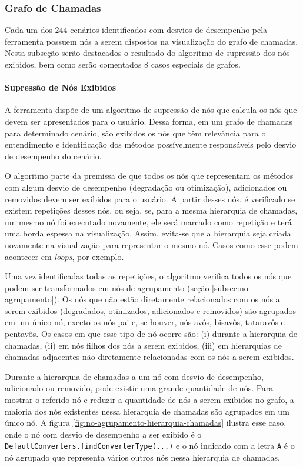 \subsubsection{Grafo de Chamadas} \label{subsec:avaliacao-comportamento-grafo-chamadas}

Cada um dos 244 cenários identificados com desvios de desempenho pela ferramenta possuem nós a serem dispostos na visualização do grafo de chamadas. Nesta subseção serão destacados o resultado do algoritmo de supressão dos nós exibidos, bem como serão comentados 8 casos especiais de grafos.

\paragraph{Supressão de Nós Exibidos}

A ferramenta dispõe de um algoritmo de supressão de nós que calcula os nós que devem ser apresentados para o usuário. Dessa forma, em um grafo de chamadas para determinado cenário, são exibidos os nós que têm relevância para o entendimento e identificação dos métodos possívelmente responsáveis pelo desvio de desempenho do cenário.

O algoritmo parte da premissa de que todos os nós que representam os métodos com algum desvio de desempenho (degradação ou otimização), adicionados ou removidos devem ser exibidos para o usuário. A partir desses nós, é verificado se existem repetições desses nós, ou seja, se, para a mesma hierarquia de chamadas, um mesmo nó foi executado novamente, ele será marcado como repetição e terá uma borda espessa na visualização. Assim, evita-se que a hierarquia seja criada novamente na visualização para representar o mesmo nó. Casos como esse podem acontecer em \textit{loops}, por exemplo.

Uma vez identificadas todas as repetições, o algoritmo verifica todos os nós que podem ser transformados em nós de agrupamento (seção \ref{subsec:no-agrupamento}). Os nós que não estão diretamente relacionados com os nós a serem exibidos (degradados, otimizados, adicionados e removidos) são agrupados em um único nó, exceto os nós pai e, se houver, nós avôs, bisavôs, tataravôs e pentavôs. Os casos em que esse tipo de nó ocorre são: (i) durante a hierarquia de chamadas, (ii) em nós filhos dos nós a serem exibidos, (iii) em hierarquias de chamadas adjacentes não diretamente relacionadas com os nós a serem exibidos.

Durante a hierarquia de chamadas a um nó com desvio de desempenho, adicionado ou removido, pode existir uma grande quantidade de nós. Para mostrar o referido nó e reduzir a quantidade de nós a serem exibidos no grafo, a maioria dos nós existentes nessa hierarquia de chamadas são agrupados em um único nó. A figura \ref{fig:no-agrupamento-hierarquia-chamadas} ilustra esse caso, onde o nó com desvio de desempenho a ser exibido é o \texttt{DefaultConverters.findConverterType(...)} e o nó indicado com a letra \texttt{A} é o nó agrupado que representa vários outros nós nessa hierarquia de chamadas.

